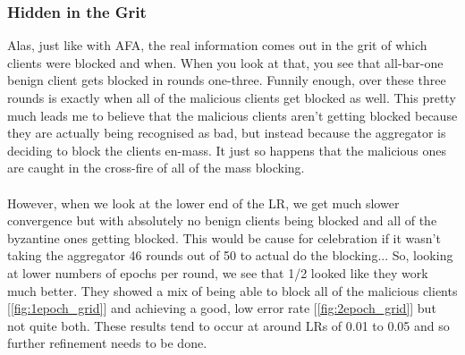 \subsubsection{Hidden in the Grit}

Alas, just like with AFA, the real information comes out in the grit of which clients were blocked and when.
When you look at that, you see that all-bar-one benign client gets blocked in rounds one-three.
Funnily enough, over these three rounds is exactly when all of the malicious clients get blocked as well.
This pretty much leads me to believe that the malicious clients aren't getting blocked because they are actually being recognised as bad, but instead because the aggregator is deciding to block the clients en-mass.
It just so happens that the malicious ones are caught in the cross-fire of all of the mass blocking.
\\ \\
However, when we look at the lower end of the LR, we get much slower convergence but with absolutely no benign clients being blocked and all of the byzantine ones getting blocked.
This would be cause for celebration if it wasn't taking the aggregator 46 rounds out of 50 to actual do the blocking...
So, looking at lower numbers of epochs per round, we see that 1/2 looked like they work much better.
They showed a mix of being able to block all of the malicious clients [\ref{fig:1epoch_grid}] and achieving a good, low error rate [\ref{fig:2epoch_grid}] but not quite both.
These results tend to occur at around LRs of 0.01 to 0.05 and so further refinement needs to be done.

